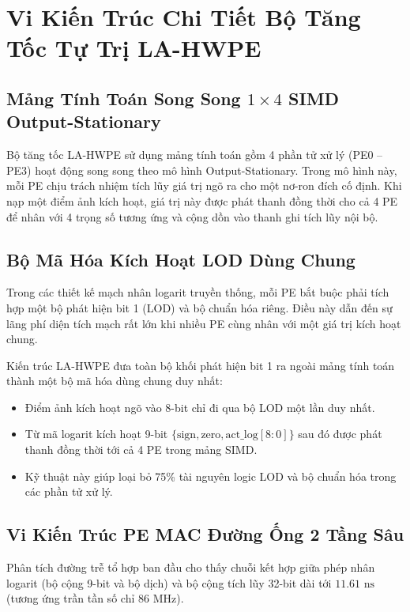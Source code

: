 \documentclass[conference]{IEEEtran}
\begin{document}
\section{Vi Kiến Trúc Chi Tiết Bộ Tăng Tốc Tự Trị LA-HWPE}
\label{sec:hwpe_arch}

\subsection{Mảng Tính Toán Song Song $1\times 4$ SIMD Output-Stationary}
\hspace*{1em} Bộ tăng tốc LA-HWPE sử dụng mảng tính toán gồm 4 phần tử xử lý (PE0 -- PE3) hoạt động song song theo mô hình Output-Stationary. Trong mô hình này, mỗi PE chịu trách nhiệm tích lũy giá trị ngõ ra cho một nơ-ron đích cố định. Khi nạp một điểm ảnh kích hoạt, giá trị này được phát thanh đồng thời cho cả 4 PE để nhân với 4 trọng số tương ứng và cộng dồn vào thanh ghi tích lũy nội bộ.

\subsection{Bộ Mã Hóa Kích Hoạt LOD Dùng Chung}
\hspace*{1em} Trong các thiết kế mạch nhân logarit truyền thống, mỗi PE bắt buộc phải tích hợp một bộ phát hiện bit 1 (LOD) và bộ chuẩn hóa riêng. Điều này dẫn đến sự lãng phí diện tích mạch rất lớn khi nhiều PE cùng nhân với một giá trị kích hoạt chung.

Kiến trúc LA-HWPE đưa toàn bộ khối phát hiện bit 1 ra ngoài mảng tính toán thành một bộ mã hóa dùng chung duy nhất:
\begin{itemize}
    \item Điểm ảnh kích hoạt ngõ vào 8-bit chỉ đi qua bộ LOD một lần duy nhất.
    \item Từ mã logarit kích hoạt 9-bit $\{ \text{sign}, \text{zero}, \text{act\_log}[8:0] \}$ sau đó được phát thanh đồng thời tới cả 4 PE trong mảng SIMD.
    \item Kỹ thuật này giúp loại bỏ 75\% tài nguyên logic LOD và bộ chuẩn hóa trong các phần tử xử lý.
\end{itemize}

\subsection{Vi Kiến Trúc PE MAC Đường Ống 2 Tầng Sâu}
\hspace*{1em} Phân tích đường trễ tổ hợp ban đầu cho thấy chuỗi kết hợp giữa phép nhân logarit (bộ cộng 9-bit và bộ dịch) và bộ cộng tích lũy 32-bit dài tới $11.61\text{ ns}$ (tương ứng trần tần số chỉ $86\text{ MHz}$).
\end{document}
